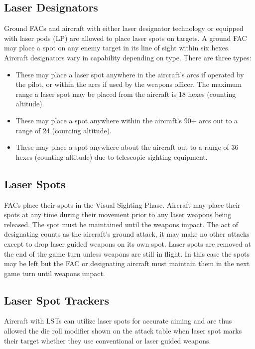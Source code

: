 \subsection{Laser Designators} Ground FACs and aircraft with either laser designator technology or equipped with laser pods (LP) are allowed to place laser spots on targets. A ground FAC may place a spot on any enemy target in its line of sight within six hexes. Aircraft designators vary in capability depending on type. There are three types:

\begin{itemize}

\item{} These may place a laser spot anywhere in the aircraft's  arcs if operated by the pilot, or within the  arcs if used by the weapons officer. The maximum range a laser spot may be placed from the aircraft is 18 hexes (counting altitude).

\item{} These may place a spot anywhere within the aircraft's 90+ arcs out to a range of 24 (counting altitude).

\item{} These may place a spot anywhere about the aircraft out to a range of 36 hexes (counting altitude) due to telescopic sighting equipment.

\end{itemize}


\subsection{Laser Spots}
\label{rule:laser-spots}
FACs place their spots in the Visual Sighting Phase. Aircraft may place their spots at any time during their movement prior to any laser weapons being released. The spot must be maintained until the weapons impact. The act of designating counts as the aircraft's ground attack, it may make no other attacks except to drop laser guided weapons on its own spot. Laser spots are removed at the end of the game turn unless weapons are still in flight. In this case the spots may be left but the FAC or designating aircraft must maintain them in the next game turn until weapons impact.

\subsection{Laser Spot Trackers} Aircraft with LSTs can utilize laser spots for accurate aiming and are thus allowed the die roll modifier shown on the attack table when laser spot marks their target whether they use conventional or laser guided weapons.

